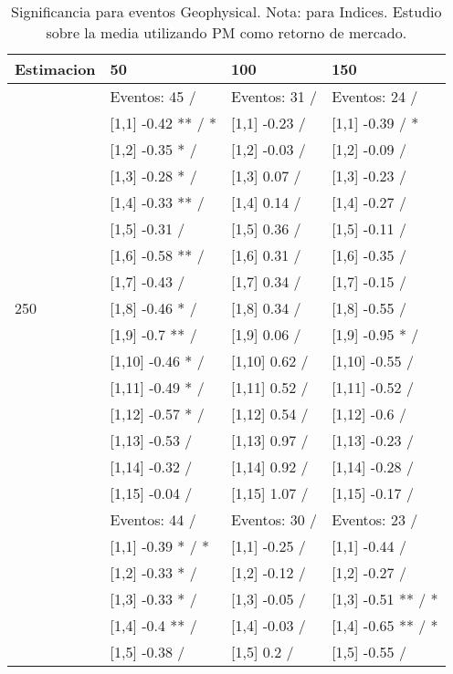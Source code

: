 \begin{table}

\caption{Significancia para eventos Geophysical. Nota: para Indices. Estudio sobre la media utilizando PM como retorno de mercado.}
\centering
\begin{tabular}[t]{llll}
\toprule
Estimacion & 50 & 100 & 150\\
\midrule
 & Eventos:  45 / & Eventos:  31 / & Eventos:  24 /\\
 & {}[1,1] -0.42 ** / * & {}[1,1] -0.23  / & {}[1,1] -0.39  / *\\
 & {}[1,2] -0.35 * / & {}[1,2] -0.03  / & {}[1,2] -0.09  /\\
 & {}[1,3] -0.28 * / & {}[1,3] 0.07  / & {}[1,3] -0.23  /\\
 & {}[1,4] -0.33 ** / & {}[1,4] 0.14  / & {}[1,4] -0.27  /\\
\addlinespace
 & {}[1,5] -0.31  / & {}[1,5] 0.36  / & {}[1,5] -0.11  /\\
 & {}[1,6] -0.58 ** / & {}[1,6] 0.31  / & {}[1,6] -0.35  /\\
 & {}[1,7] -0.43  / & {}[1,7] 0.34  / & {}[1,7] -0.15  /\\
250 & {}[1,8] -0.46 * / & {}[1,8] 0.34  / & {}[1,8] -0.55  /\\
 & {}[1,9] -0.7 ** / & {}[1,9] 0.06  / & {}[1,9] -0.95 * /\\
\addlinespace
 & {}[1,10] -0.46 * / & {}[1,10] 0.62  / & {}[1,10] -0.55  /\\
 & {}[1,11] -0.49 * / & {}[1,11] 0.52  / & {}[1,11] -0.52  /\\
 & {}[1,12] -0.57 * / & {}[1,12] 0.54  / & {}[1,12] -0.6  /\\
 & {}[1,13] -0.53  / & {}[1,13] 0.97  / & {}[1,13] -0.23  /\\
 & {}[1,14] -0.32  / & {}[1,14] 0.92  / & {}[1,14] -0.28  /\\
\addlinespace
 & {}[1,15] -0.04  / & {}[1,15] 1.07  / & {}[1,15] -0.17  /\\
 & Eventos:  44 / & Eventos:  30 / & Eventos:  23 /\\
 & {}[1,1] -0.39 * / * & {}[1,1] -0.25  / & {}[1,1] -0.44  /\\
 & {}[1,2] -0.33 * / & {}[1,2] -0.12  / & {}[1,2] -0.27  /\\
 & {}[1,3] -0.33 * / & {}[1,3] -0.05  / & {}[1,3] -0.51 ** / *\\
\addlinespace
 & {}[1,4] -0.4 ** / & {}[1,4] -0.03  / & {}[1,4] -0.65 ** / *\\
 & {}[1,5] -0.38  / & {}[1,5] 0.2  / & {}[1,5] -0.55  /\\

\end{tabular}
\end{table}
